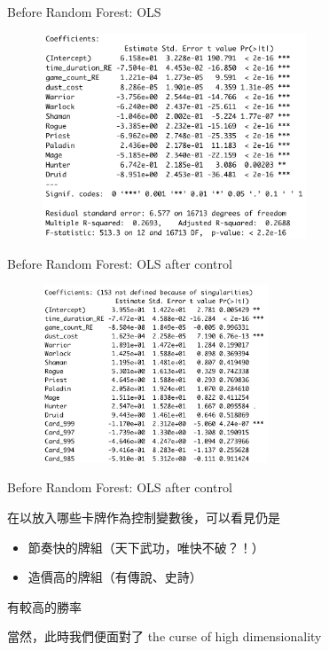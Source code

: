 \documentclass[12pt]{beamer}
\begin{document}
\begin{frame}[fragile]{Before Random Forest: OLS}

	\begin{figure}
		\begin{center}
			\includegraphics[width=0.7\textwidth]{figure/f06.png}
		\end{center}
	\end{figure}

\end{frame}

\begin{frame}[fragile]{Before Random Forest: OLS after control}

	\begin{figure}
		\begin{center}
			\includegraphics[width=0.6\textwidth]{figure/f07.png}
		\end{center}
	\end{figure}


\end{frame}

\begin{frame}[fragile]{Before Random Forest: OLS after control}

在以放入哪些卡牌作為控制變數後，可以看見仍是

	\begin{itemize}
		\item 節奏快的牌組（天下武功，唯快不破？！）
		\item 造價高的牌組（有傳說、史詩）
	\end{itemize}
	有較高的勝率

當然，此時我們便面對了 the curse of high dimensionality

\end{frame}
\end{document}
